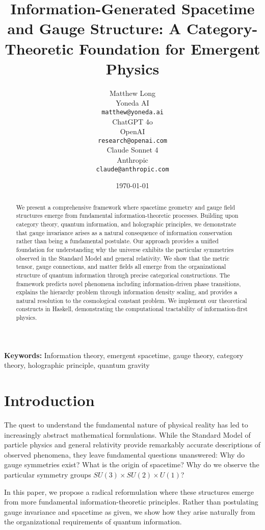 \documentclass{article}
\title{Information-Generated Spacetime and Gauge Structure: A Category-Theoretic Foundation for Emergent Physics}
\author{
 Matthew Long \\
 Yoneda AI\\
 \texttt{matthew@yoneda.ai} \\
 \And
 ChatGPT 4o \\
 OpenAI\\
 \texttt{research@openai.com} \\
 \And
 Claude Sonnet 4 \\
 Anthropic\\
 \texttt{claude@anthropic.com} \\
}
\date{\today}
\begin{document}
\maketitle

\begin{abstract}
We present a comprehensive framework where spacetime geometry and gauge field structures emerge from fundamental information-theoretic processes. Building upon category theory, quantum information, and holographic principles, we demonstrate that gauge invariance arises as a natural consequence of information conservation rather than being a fundamental postulate. Our approach provides a unified foundation for understanding why the universe exhibits the particular symmetries observed in the Standard Model and general relativity. We show that the metric tensor, gauge connections, and matter fields all emerge from the organizational structure of quantum information through precise categorical constructions. The framework predicts novel phenomena including information-driven phase transitions, explains the hierarchy problem through information density scaling, and provides a natural resolution to the cosmological constant problem. We implement our theoretical constructs in Haskell, demonstrating the computational tractability of information-first physics.
\end{abstract}

\textbf{Keywords:} Information theory, emergent spacetime, gauge theory, category theory, holographic principle, quantum gravity

\section{Introduction}

The quest to understand the fundamental nature of physical reality has led to increasingly abstract mathematical formulations. While the Standard Model of particle physics and general relativity provide remarkably accurate descriptions of observed phenomena, they leave fundamental questions unanswered: Why do gauge symmetries exist? What is the origin of spacetime? Why do we observe the particular symmetry groups $SU(3) \times SU(2) \times U(1)$?

In this paper, we propose a radical reformulation where these structures emerge from more fundamental information-theoretic principles. Rather than postulating gauge invariance and spacetime as given, we show how they arise naturally from the organizational requirements of quantum information.
\end{document}
